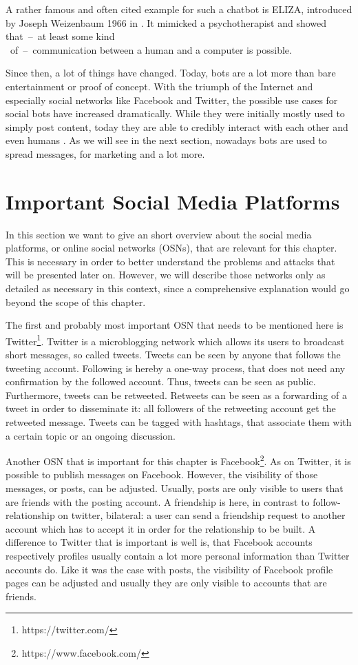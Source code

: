 A rather famous and often cited example for such a chatbot is ELIZA, introduced by Joseph Weizenbaum 1966 in \cite{eliza}. It mimicked a psychotherapist and showed \mbox{that -- at} least some kind\\ \mbox{ of -- communication} between a human and a computer is possible.

Since then, a lot of things have changed. Today, bots are a lot more than bare entertainment or proof of concept. With the triumph of the Internet and especially social networks like Facebook and Twitter, the possible use cases for social bots have increased dramatically. While they were initially mostly used to simply post content, today they are able to credibly interact with each other and even humans \cite{boshmaf13, hwang12}. As we will see in the next section, nowadays bots are used to spread messages, for marketing and a lot more.

\section{Important Social Media Platforms}

In this section we want to give an short overview about the social media platforms, or online social networks (OSNs), that are relevant for this chapter. This is necessary in order to better understand the problems and attacks that will be presented later on. However, we will describe those networks only as detailed as necessary in this context, since a comprehensive explanation would go beyond the scope of this chapter.

The first and probably most important OSN that needs to be mentioned here is Twitter\footnote{https://twitter.com/}. Twitter is a microblogging network which allows its users to broadcast short messages, so called tweets. Tweets can be seen by anyone that follows the tweeting account. Following is hereby a one-way process, that does not need any confirmation by the followed account. Thus, tweets can be seen as public. Furthermore, tweets can be retweeted. Retweets can be seen as a forwarding of a tweet in order to disseminate it: all followers of the retweeting account get the retweeted message.  Tweets can be tagged with hashtags, that associate them with a certain topic or an ongoing discussion.

Another OSN that is important for this chapter is Facebook\footnote{https://www.facebook.com/}. As on Twitter, it is possible to publish messages on Facebook. However, the visibility of those messages, or posts, can be adjusted. Usually, posts are only visible to users that are friends with the posting account. A friendship is here, in contrast to follow-relationship on twitter, bilateral: a user can send a friendship request to another account which has to accept it in order for the relationship to be built. A difference to Twitter that is important is well is, that Facebook accounts respectively profiles usually contain a lot more personal information than Twitter accounts do. Like it was the case with posts, the visibility of Facebook profile pages can be adjusted and usually they are only visible to accounts that are friends.

